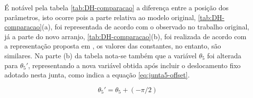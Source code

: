 \begin{table}[htb]
\begin{centering}
\begin{floatrow}

    \end{floatrow}

\caption{Comparação entre parâmetros DH para modelo original e modificado.}
\label{tab:DH-comparacao}

\par\end{centering}
\end{table}

É notável pela tabela \ref{tab:DH-comparacao} a diferença entre a posição dos 
parâmetros, isto ocorre pois a parte relativa ao modelo original, \ref{tab:DH-comparacao}(a),
foi representada de acordo com o observado no trabalho original, já a
parte do novo arranjo, \ref{tab:DH-comparacao}(b), foi realizada de acordo com 
a representação proposta em \cite{craig2009introduction}, os valores das 
constantes, no entanto, são similares. 
Na parte (b) da tabela nota-se também que a variável $\theta_5$ foi alterada 
para $\theta_5'$, representando a nova variável obtida após incluir o deslocamento 
fixo adotado nesta junta, como indica a equação \ref{eq:junta5-offset}.

\vspace{-2ex}
\begin{equation}
    \theta_5' = \theta_5 + (-\pi/2)
    \label{eq:junta5-offset}
\end{equation}

